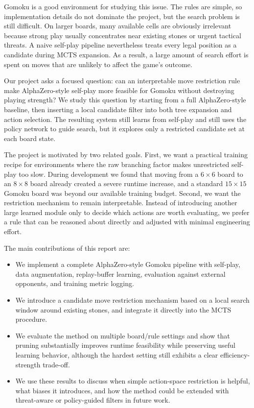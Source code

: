 \documentclass{article}
\begin{document}
Gomoku is a good environment for studying this issue. The rules are simple, so implementation details do not dominate the project, but the search problem is still difficult. On larger boards, many available cells are obviously irrelevant because strong play usually concentrates near existing stones or urgent tactical threats. A naive self-play pipeline nevertheless treats every legal position as a candidate during MCTS expansion. As a result, a large amount of search effort is spent on moves that are unlikely to affect the game's outcome.

Our project asks a focused question: can an interpretable move restriction rule make AlphaZero-style self-play more feasible for Gomoku without destroying playing strength? We study this question by starting from a full AlphaZero-style baseline, then inserting a local candidate filter into both tree expansion and action selection. The resulting system still learns from self-play and still uses the policy network to guide search, but it explores only a restricted candidate set at each board state.

The project is motivated by two related goals. First, we want a practical training recipe for environments where the raw branching factor makes unrestricted self-play too slow. During development we found that moving from a \(6 \times 6\) board to an \(8 \times 8\) board already created a severe runtime increase, and a standard \(15 \times 15\) Gomoku board was beyond our available training budget. Second, we want the restriction mechanism to remain interpretable. Instead of introducing another large learned module only to decide which actions are worth evaluating, we prefer a rule that can be reasoned about directly and adjusted with minimal engineering effort.

The main contributions of this report are:
\begin{itemize}
  \item We implement a complete AlphaZero-style Gomoku pipeline with self-play, data augmentation, replay-buffer learning, evaluation against external opponents, and training metric logging.
  \item We introduce a candidate move restriction mechanism based on a local search window around existing stones, and integrate it directly into the MCTS procedure.
  \item We evaluate the method on multiple board/rule settings and show that pruning substantially improves runtime feasibility while preserving useful learning behavior, although the hardest setting still exhibits a clear efficiency-strength trade-off.
  \item We use these results to discuss when simple action-space restriction is helpful, what biases it introduces, and how the method could be extended with threat-aware or policy-guided filters in future work.
\end{itemize}
\end{document}
